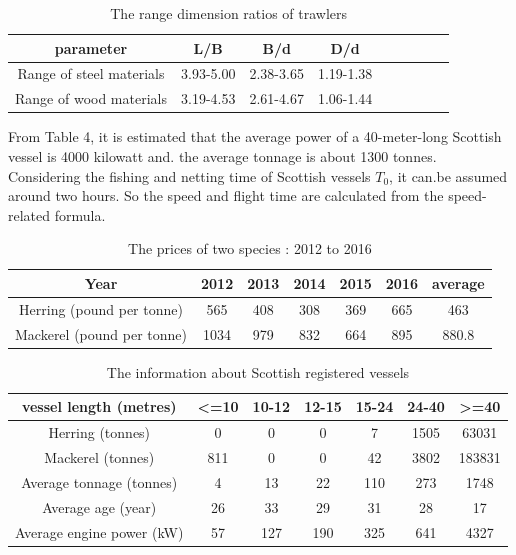 \documentclass{mcmthesis}
\begin{document}
\begin{table}[!htb]
  \centering
  \setlength{\abovecaptionskip}{0pt}%
  \setlength{\belowcaptionskip}{15pt}%
  \caption{The range dimension ratios of  trawlers}
  \begin{tabular}{ccccccccc}
  \toprule[1.5pt]
  parameter &L/B&B/d&D/d\\
  \toprule[1.5pt]
  Range of steel materials&3.93-5.00&2.38-3.65&1.19-1.38\\
  Range of wood materials&3.19-4.53&2.61-4.67&1.06-1.44\\
  \bottomrule[1.5pt]
  \end{tabular}
  \end{table}

From Table 4, it is estimated that the average power of a 40-meter-long Scottish vessel is 4000 kilowatt and. the average tonnage is about 1300 tonnes. Considering the fishing and netting time of Scottish vessels  $T_0$, it can.be assumed around two hours. So the speed and flight time are calculated from the speed-related formula.



\begin{table}[!htb]
\centering
\setlength{\abovecaptionskip}{0pt}%
\setlength{\belowcaptionskip}{13pt}%
\caption{The prices of two species : 2012 to 2016}
\begin{tabular}{ccccccc}
\toprule[1.5pt]
Year&2012&2013&2014&2015&2016&average\\
\bottomrule[1.5pt]
Herring (pound  per tonne)  &565&408&308&369&665&463\\
Mackerel (pound  per tonne)  &1034&979&832&664&895&880.8\\
\bottomrule[1.5pt]
\end{tabular}
\end{table}


\begin{table}[!htb]
\centering
\setlength{\abovecaptionskip}{0pt}%
\setlength{\belowcaptionskip}{13pt}%
\caption{The information about Scottish registered vessels}
\begin{tabular}{ccccccc}
\toprule[1.5pt]
vessel length (metres)&<=10&10-12&12-15&15-24&24-40&>=40\\
\bottomrule[1.5pt]
Herring (tonnes)&0&0&0&7&1505&63031\\
Mackerel (tonnes) &811&0&0&42&3802&183831\\
Average tonnage (tonnes)&4&13&22&110&273&1748\\
Average age (year)&26&33&29&31&28&17\\
Average engine power (kW)&57&127&190&325&641&4327\\

\bottomrule[1.5pt]
\end{tabular}
\end{table}
\end{document}
